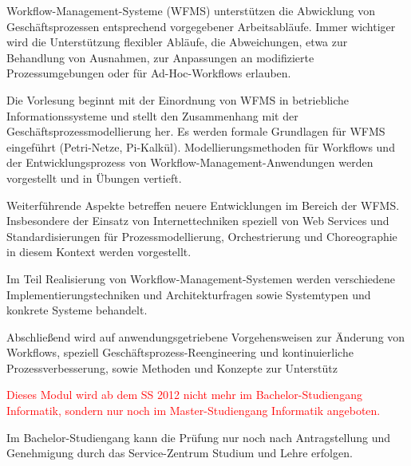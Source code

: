 \begin{module}
\begin{learningoutcomes}
\end{learningoutcomes}

\begin{content}
Workflow-Management-Systeme (WFMS) unterstützen die Abwicklung von Geschäftsprozessen entsprechend vorgegebener Arbeitsabläufe. Immer wichtiger wird die Unterstützung flexibler Abläufe, die Abweichungen, etwa zur Behandlung von Ausnahmen, zur Anpassungen an modifizierte Prozessumgebungen oder für Ad-Hoc-Workflows erlauben.

 

Die Vorlesung beginnt mit der Einordnung von WFMS in betriebliche Informationssysteme und stellt den Zusammenhang mit der Geschäftsprozessmodellierung her. Es werden formale Grundlagen für WFMS eingeführt (Petri-Netze, Pi-Kalkül). Modellierungsmethoden für Workflows und der Entwicklungsprozess von Workflow-Management-Anwendungen werden vorgestellt und in Übungen vertieft.

 

Weiterführende Aspekte betreffen neuere Entwicklungen im Bereich der WFMS. Insbesondere der Einsatz von Internettechniken speziell von Web Services und Standardisierungen für Prozessmodellierung, Orchestrierung und Choreographie in diesem Kontext werden vorgestellt.

 

Im Teil Realisierung von Workflow-Management-Systemen werden verschiedene Implementierungstechniken und Architekturfragen sowie Systemtypen und konkrete Systeme behandelt.

 

Abschließend wird auf anwendungsgetriebene Vorgehensweisen zur Änderung von Workflows, speziell Geschäftsprozess-Reengineering und kontinuierliche Prozessverbesserung, sowie Methoden und Konzepte zur Unterstütz


\end{content}

\begin{remarks}\textcolor{red}{Dieses Modul wird ab dem SS 2012 nicht mehr im Bachelor-Studiengang Informatik, sondern nur noch im Master-Studiengang Informatik angeboten.}

 

Im Bachelor-Studiengang kann die Prüfung nur noch nach Antragstellung und Genehmigung durch das Service-Zentrum Studium und Lehre erfolgen.

\end{remarks}

\end{module}

